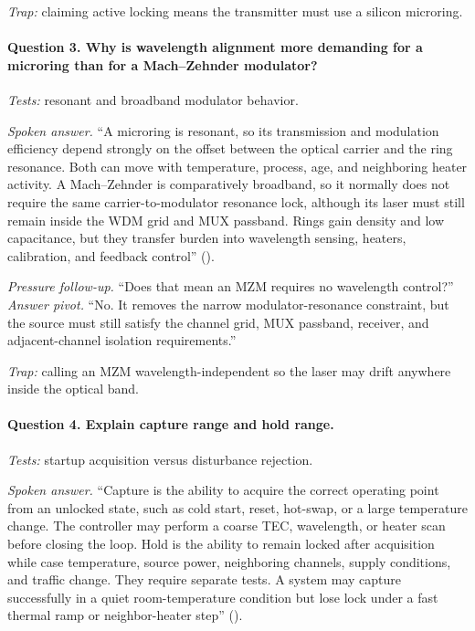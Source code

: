 \textit{Trap:} claiming active locking means the transmitter must use a silicon
microring.

\paragraph{Question 3. Why is wavelength alignment more demanding for a microring
than for a Mach--Zehnder modulator?}
\textit{Tests:} resonant and broadband modulator behavior.

\textit{Spoken answer.}
``A microring is resonant, so its transmission and modulation efficiency depend
strongly on the offset between the optical carrier and the ring resonance. Both
can move with temperature, process, age, and neighboring heater activity. A
Mach--Zehnder is comparatively broadband, so it normally does not require the
same carrier-to-modulator resonance lock, although its laser must still remain
inside the WDM grid and MUX passband. Rings gain density and low capacitance,
but they transfer burden into wavelength sensing, heaters, calibration, and
feedback control'' ().

\textit{Pressure follow-up.} ``Does that mean an MZM requires no wavelength
control?''\\
\textit{Answer pivot.} ``No. It removes the narrow modulator-resonance
constraint, but the source must still satisfy the channel grid, MUX passband,
receiver, and adjacent-channel isolation requirements.''

\textit{Trap:} calling an MZM wavelength-independent so the laser may drift
anywhere inside the optical band.

\paragraph{Question 4. Explain capture range and hold range.}
\textit{Tests:} startup acquisition versus disturbance rejection.

\textit{Spoken answer.}
``Capture is the ability to acquire the correct operating point from an unlocked
state, such as cold start, reset, hot-swap, or a large temperature change. The
controller may perform a coarse TEC, wavelength, or heater scan before closing
the loop. Hold is the ability to remain locked after acquisition while case
temperature, source power, neighboring channels, supply conditions, and traffic
change. They require separate tests. A system may capture successfully in a
quiet room-temperature condition but lose lock under a fast thermal ramp or
neighbor-heater step'' ().

